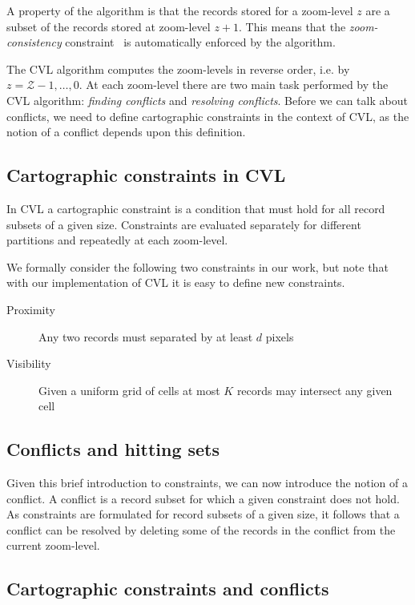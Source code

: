 A property of the algorithm is that the records stored for a zoom-level $z$ are a subset of the records stored at zoom-level $z+1$. This means that the \emph{zoom-consistency} constraint~\cite{fusiontables} is automatically enforced by the algorithm.

The CVL algorithm computes the zoom-levels in reverse order, i.e. by $z = \mathcal{Z}-1, \dots, 0$. At each zoom-level there are two main task performed by the CVL algorithm: \emph{finding conflicts} and \emph{resolving conflicts}. Before we can talk about conflicts, we need to define cartographic constraints in the context of CVL, as the notion of a conflict depends upon this definition.

\subsection{Cartographic constraints in CVL}

In CVL a cartographic constraint is a condition that must hold for all record subsets of a given size. Constraints are evaluated separately for different partitions and repeatedly at each zoom-level.

We formally consider the following two constraints in our work, but note that with our implementation of CVL it is easy to define new constraints. 

\begin{description}
\item [Proximity] Any two records must separated by at least $d$ pixels
\item [Visibility] Given a uniform grid of cells at most $K$ records may intersect any given cell
\end{description}

\subsection{Conflicts and hitting sets}

Given this brief introduction to constraints, we can now introduce the notion of a conflict. 
A conflict is a record subset for which a given constraint does not hold. As constraints are formulated for record subsets of a given size, it follows that a conflict can be resolved by deleting some of the records in the conflict from the current zoom-level.


\subsection{Cartographic constraints and conflicts}

